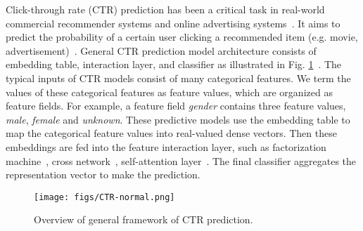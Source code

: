 \documentclass[sigconf]{acmart}
\begin{document}
Click-through rate (CTR) prediction has been a critical task in real-world commercial recommender systems and online advertising systems~\cite{ADS,DLRM}. It aims to predict the probability of a certain user clicking a recommended item (e.g. movie, advertisement)~\cite{FM,DeepFM,DCN,AutoInt}. General CTR prediction model architecture consists of embedding table, interaction layer, and classifier as illustrated in Fig. \ref{fig:normal}~\cite{AutoIAS,DeepFM,DCN,AutoInt}. The typical inputs of CTR models consist of many categorical features. We term the values of these categorical features as feature values, which are organized as feature fields. For example, a feature field \textit{gender} contains three feature values, \textit{male}, \textit{female} and \textit{unknown}. These predictive models use the embedding table to map the categorical feature values into real-valued dense vectors. Then these embeddings are fed into the feature interaction layer, such as factorization machine~\cite{FM}, cross network~\cite{DCN}, self-attention layer~\cite{AutoInt}. The final classifier aggregates the representation vector to make the prediction. 

\begin{figure}[!htbp]
    \centering
    \centering
    \texttt{[image: figs/CTR-normal.png]}
    \vspace{-5pt}
    \caption{Overview of general framework of CTR prediction.}
    \label{fig:normal}
    \vspace{-10pt}
\end{figure}
\end{document}
